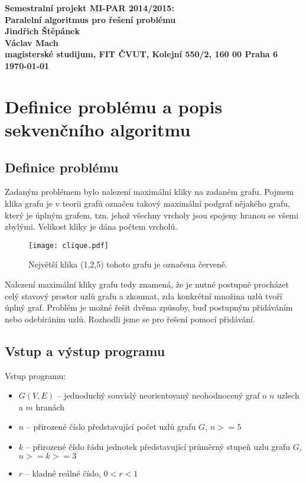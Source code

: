 \documentclass[12pt]{article}
\begin{document}
\begin{center}
  \bf Semestralní projekt MI-PAR 2014/2015:\\[5mm]
      Paralelní algoritmus pro řešení problému\\[5mm]
         Jindřich Štěpánek\\
         Václav Mach\\[2mm]
  magisterské studijum, FIT ČVUT, Kolejní 550/2, 160 00 Praha 6\\[2mm]
  \today
\end{center}

\section{Definice problému a popis sekvenčního algoritmu}

\subsection{Definice problému}

Zadaným problémem bylo nalezení maximální kliky na zadaném grafu.
Pojmem klika grafu je v teorii grafů označen takový maximální podgraf nějakého grafu, 
který je úplným grafem, tzn. jehož všechny vrcholy jsou spojeny hranou se všemi zbylými.
Velikost kliky je dána počtem vrcholů.

\begin{figure}[ht]
  \begin{center}
    \texttt{[image: clique.pdf]}
  \end{center}
  \caption{Největší klika (1,2,5) tohoto grafu je označena červeně.}
\end{figure}

Nalezení maximální kliky grafu tedy znamená, že je nutné postupně procházet celý stavový prostor uzlů grafu
a zkoumat, zda konkrétní množina uzlů tvoří úplný graf. Problém je možné řešit dvěma způsoby, 
buď postupným přidáváním nebo odebíráním uzlů. Rozhodli jsme se pro řešení pomocí přidávání.

\subsection{Vstup a výstup programu}

Vstup programu:
\begin{itemize}
  \item{$G(V,E)$ -- jednoduchý souvislý neorientovaný neohodnocený graf o $n$ uzlech a $m$ hranách}
  \item{$n$ -- přirozené číslo představující počet uzlů grafu $G$, $n >= 5$}
  \item{$k$ -- přirozené číslo řádu jednotek představující průměrný stupeň uzlu grafu $G$, $n >= k >= 3$}
  \item{$r$ -- kladné reálné číslo, $0 < r < 1$}
\end{itemize}
\end{document}
